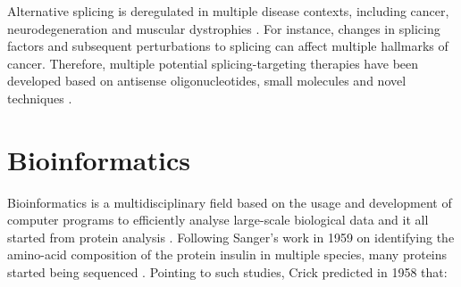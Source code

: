 Alternative splicing is deregulated in multiple disease contexts, including cancer, neurodegeneration and muscular dystrophies \cite{montes:2019ww}. For instance, changes in splicing factors and subsequent  perturbations to splicing can affect multiple hallmarks of cancer. Therefore, multiple potential splicing-targeting therapies have been developed based on antisense oligonucleotides, small molecules and novel techniques \cite{montes:2019ww}.



\section{Bioinformatics}



Bioinformatics is a multidisciplinary field based on the usage and development of computer programs to efficiently analyse large-scale biological data and it all started from protein analysis \cite{gauthier:2018ws}. Following Sanger's work in 1959 on identifying the amino-acid composition of the protein insulin in multiple species, many proteins started being sequenced \cite{sanger:1955uw,ryle:1955wf,harris:1956ut,gauthier:2018ws}.
Pointing to such studies, Crick predicted in 1958 that:


